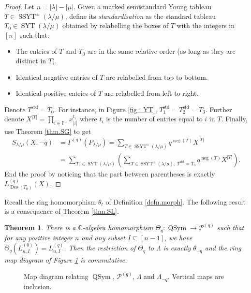 \documentclass[revision]{FPSAC2024}
\newtheorem{theorem}{Theorem}
\newcommand{\la}{\lambda}
\newcommand{\CC}{\mathbb{C}} %
\newcommand{\PP}{\mathbb{P}} %
\newcommand{\QSym}{\operatorname{QSym}}
\newcommand{\SYT}{\operatorname{SYT}}
\newcommand{\SSYT}{\operatorname{SSYT}}
\newcommand{\std}{\operatorname{std}}
\newcommand{\nega}{\operatorname{neg}}
\newcommand{\Des}{\operatorname{Des}}
\begin{document}
%
\begin{proof}
Let $n = |\la|-|\mu|$. Given a marked semistandard Young tableau $T \in \SSYT^\pm(\la/\mu)$, define its \emph{standardisation} as the standard tableau $T_{0} \in \SYT(\la/\mu)$ obtained by relabelling the boxes of $T$ with the integers in $[n]$ such that: 
\begin{itemize}
\item The entries of $T$ and $T_{0}$ are in the same relative order (as long as they are distinct in $T$).
\item Identical negative entries of $T$ are relabelled from top to bottom.
\item Identical positive entries of $T$ are relabelled from left to right. 
\end{itemize}
Denote $T^{\std} = T_0$. For instance, in Figure \ref{fig : YT}, $T_1^{\std}= T_2^{\std} = T_3$. Further denote $X^{|T|} = \prod_{i \in \PP^\pm}x_{|i|}^{t_i}$ where $t_i$ is the number of entries equal to $i$ in $T$. Finally, use Theorem \ref{thm.SG} to get
\begin{align*}
S_{\la/\mu}(X;-q) &= \Gamma^{(q)}(P_{\la/\mu}) = \sum_{T \in \SSYT^\pm(\la/\mu)}q^{\nega(T)}X^{|T|}\\
&=\sum_{T_0 \in \SYT(\la/\mu)}\left (\sum_{T \in \SSYT^\pm(\la/\mu),\; T^{\std} = T_0}q^{\nega(T)}X^{|T|}\right).
\end{align*}
End the proof by noticing that the part between parentheses is exactly $L^{(q)}_{\Des(T_0)}(X)$.
\end{proof}
Recall the ring homomorphism $\theta_t$ of Definition \ref{defn.morph}. The following result is a consequence of Theorem \ref{thm.SL}. 
%
\begin{theorem}
\label{thm.theta}
There is a $\CC$-algebra homomorphism $\Theta_q : \QSym \longrightarrow \mathcal{P}^{(q)}$ such that for any positive integer $n$ and any subset $I\subseteq [n-1]$, we have $\Theta_q \left (L^{(0)}_{n, I} \right) = L^{(q)}_{n, I}$. Then the restriction of $\Theta_q$ to $\Lambda$ is exactly  $\theta_{-q}$ and the ring map diagram of Figure \ref{fig.ring_map} is commutative. 
\end{theorem}
\begin{figure}[htbp]
\begin{center}
\end{center}
\caption{Map diagram relating $\QSym$, $\mathcal{P}^{(q)}$, $\Lambda$ and $\Lambda_{-q}$. Vertical maps are inclusion.}
 \label{fig.ring_map}
 \end{figure}
\end{document}
